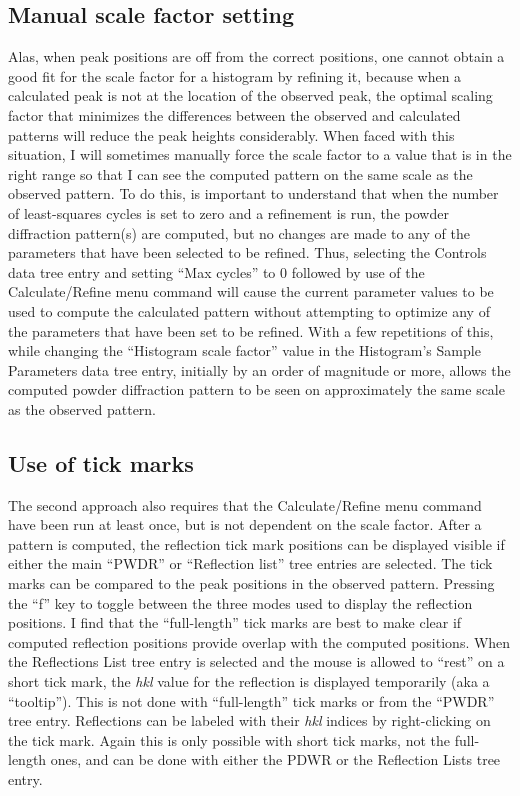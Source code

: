 \subsection{Manual scale factor setting}\label{manualscale}
Alas, when peak positions are off from the correct positions, one cannot obtain a good fit for the scale factor for a histogram by refining it, because when a calculated peak is not at the location of the observed peak, the optimal scaling factor that minimizes the differences between the observed and calculated patterns will reduce the peak heights considerably. When faced with this situation, I will sometimes manually force the scale factor to a value that is in the right range so that I can see the computed pattern on the same scale as the observed pattern. To do this, is important to understand that when the number of least-squares cycles is set to zero and a refinement is run, the powder diffraction pattern(s) are computed, but no changes are made to any of the parameters that have been selected to be refined. Thus, selecting the Controls data tree entry and setting ``Max cycles'' to 0 followed by use of the Calculate/Refine menu command will cause the current parameter values to be used to compute the calculated pattern without attempting to optimize any of the parameters that have been set to be refined. With a few repetitions of this, while changing the ``Histogram scale factor'' value in the Histogram's Sample Parameters data tree entry, initially by an order of magnitude or more, allows the computed powder diffraction pattern to be seen on approximately the same scale as the observed pattern. 

\subsection{Use of tick marks}
The second approach also requires that the Calculate/Refine menu command have been run at least once, but is not dependent on the scale factor. After a pattern is computed, the reflection tick mark positions can be displayed visible if either the main ``PWDR'' or ``Reflection list'' tree entries are selected. The tick marks can be compared to the peak positions in the observed pattern. Pressing the ``f'' key to toggle between the three modes used to display the reflection positions. I find that the ``full-length'' tick marks are best to make clear if computed reflection positions provide overlap with the computed positions. When the Reflections List tree entry is selected and the mouse is allowed to ``rest'' on a short tick mark, the \textit{hkl} value for the reflection is displayed temporarily (aka a ``tooltip''). This is not done with ``full-length'' tick marks or from the ``PWDR'' tree entry.  Reflections can be labeled with their \textit{hkl} indices by right-clicking on the tick mark. Again this is only possible with short tick marks, not the full-length ones, and can be done with either the PDWR or the Reflection Lists tree entry. 

